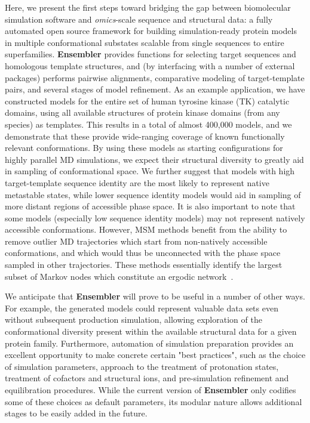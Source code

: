 \documentclass[aps,prl,preprint,nofootinbib,superscriptaddress,linenumbers]{revtex4-1}
\begin{document}
Here, we present the first steps toward bridging the gap between biomolecular simulation software and \emph{omics}-scale sequence and structural data: a fully automated open source framework for building simulation-ready protein models in multiple conformational substates scalable from single sequences to entire superfamilies.
{\bf Ensembler} provides functions for selecting target sequences and homologous template structures, and (by interfacing with a number of external packages) performs pairwise alignments, comparative modeling of target-template pairs, and several stages of model refinement.
As an example application, we have constructed models for the entire set of human tyrosine kinase (TK) catalytic domains, using all available structures of protein kinase domains (from any species) as templates.
This results in a total of almost 400,000 models, and we demonstrate that these provide wide-ranging coverage of known functionally relevant conformations.
By using these models as starting configurations for highly parallel MD simulations, we expect their structural diversity to greatly aid in sampling of conformational space.
We further suggest that models with high target-template sequence identity are the most likely to represent native metastable states, while lower sequence identity models would aid in sampling of more distant regions of accessible phase space.
It is also important to note that some models (especially low sequence identity models) may not represent natively accessible conformations.
However, MSM methods benefit from the ability to remove outlier MD trajectories which start from non-natively accessible conformations, and which would thus be unconnected with the phase space sampled in other trajectories.
These methods essentially identify the largest subset of Markov nodes which constitute an ergodic network~\cite{msmbuilder,caflisch:jpcb:2011:msm-subgraph}.

We anticipate that {\bf Ensembler} will prove to be useful in a number of other ways.
For example, the generated models could represent valuable data sets even without subsequent production simulation, allowing exploration of the conformational diversity present within the available structural data for a given protein family.
Furthermore, automation of simulation preparation provides an excellent opportunity to make concrete certain "best practices", such as the choice of simulation parameters, approach to the treatment of protonation states, treatment of cofactors and structural ions, and pre-simulation refinement and equilibration procedures.
While the current version of {\bf Ensembler} only codifies some of these choices as default parameters, its modular nature allows additional stages to be easily added in the future.
\end{document}
